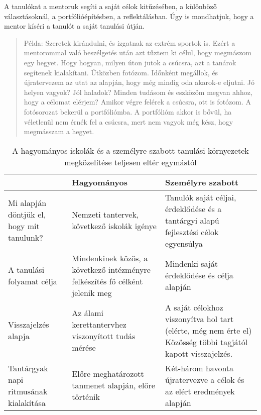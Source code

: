 A tanulókat a mentoruk segíti a saját célok kitűzésében, a különböző választásoknál, a portfólióépítésben, a reflektálásban. Úgy is mondhatjuk, hogy a mentor kíséri a tanulót a saját tanulási útján.

\begin{quote}
Példa: Szeretek kirándulni, és izgatnak az extrém sportok is. Ezért a mentorommal való beszélgetés után azt tűztem ki célul, hogy megmászom egy hegyet. Hogy hogyan, milyen úton jutok a csúcsra, azt a tanárok segítenek kialakítani. Útközben fotózom. Időnként megállok, és újratervezem az utat az alapján, hogy még mindig oda akarok-e eljutni. Jó helyen vagyok?
Jól haladok? Minden tudásom és eszközöm megvan ahhoz, hogy a célomat elérjem?
Amikor végre felérek a csúcsra, ott is fotózom. A fotósorozat bekerül a portfóliómba.
A portfólióm akkor is bővül, ha véletlenül nem érnék fel a csúcsra, mert nem vagyok még kész, hogy megmásszam a hegyet.
\end{quote}

\begin{table}
\centering
\begin{tabular}{@{}p{2cm}|p{4cm}|p{4cm}@{}}

& \textbf{Hagyományos}  & \textbf{ Személyre szabott}
\\ \hline
  Mi alapján döntjük el, hogy mit tanulunk? &
  Nemzeti tantervek, következő iskolák igénye &
  Tanulók saját céljai, érdeklődése és a tantárgyi alapú fejlesztési célok egyensúlya \\
\hline
  A tanulási folyamat célja &
   Mindenkinek közös, a következő intézményre felkészítés fő célként jelenik meg &
   Mindenki saját érdeklődése és célja alapján \\
\hline
   Visszajelzés alapja &
   Az álami kerettantervhez viszonyított tudás mérése &
   A saját célokhoz viszonyítva hol tart (elérte, még nem érte el)
   Közösség többi tagjától kapott visszajelzés.  \\
\hline
  Tantárgyak napi ritmusának kialakítása &
   Előre meghatározott tanmenet alapján, előre történik &
   Két-három havonta újratervezve a célok és az elért eredmények alapján   \\

\end{tabular}
\caption{A hagyományos iskolák és a személyre szabott tanulási környezetek megközelítése teljesen eltér egymástól}

\label{tbl:szemelyreszabott}

\end{table}

